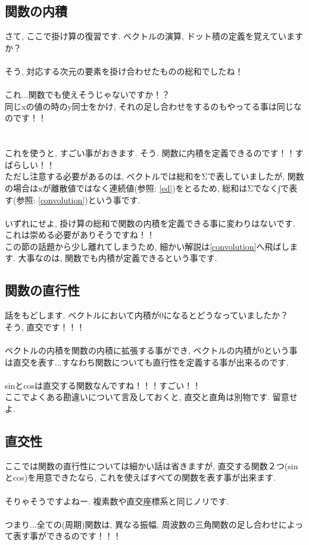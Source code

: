 \documentclass[11pt,a4paper]{jreport}
\begin{document}
\subsection{関数の内積　\label{dot}}
さて, ここで掛け算の復習です. ベクトルの演算, ドット積の定義を覚えていますか？\\
\\
そう, 対応する次元の要素を掛け合わせたものの総和でしたね！\\
\\
これ...関数でも使えそうじゃないですか！？\\
同じxの値の時のy同士をかけ, それの足し合わせをするのもやってる事は同じなのです！！\\
\\
\\
これを使うと, すごい事がおきます. そう. 関数に内積を定義できるのです！！すばらしい！！\\
ただし注意する必要があるのは, ベクトルでは総和をΣで表していましたが, 関数の場合はxが離散値ではなく連続値(参照: \ref{ed})をとるため, 総和はΣでなく∫で表す(参照: \ref{convolution})という事です.\\
\\
いずれにせよ, 掛け算の総和で関数の内積を定義できる事に変わりはないです. これは崇める必要がありそうですね！！\\
この節の話題から少し離れてしまうため, 細かい解説は\ref{convolution}へ飛ばします. 大事なのは, 関数でも内積が定義できるという事です.


\subsection{関数の直行性}
話をもどします. ベクトルにおいて内積が0になるとどうなっていましたか？\\
そう, 直交です！！！\\
\\
ベクトルの内積を関数の内積に拡張する事ができ, ベクトルの内積が0という事は直交を表す...すなわち関数についても直行性を定義する事が出来るのです.\\
\\
sinとcosは直交する関数なんですね！！！すごい！！\\
ここでよくある勘違いについて言及しておくと, 直交と直角は別物です. 留意せよ.
\subsection{直交性}
ここでは関数の直行性については細かい話は省きますが, 直交する関数２つ(sinとcos)を用意できたなら, これを使えばすべての関数を表す事が出来ます.\\
\\
そりゃそうですよねー. 複素数や直交座標系と同じノリです.\\
\\
つまり...全ての(周期)関数は, 異なる振幅, 周波数の三角関数の足し合わせによって表す事ができるのです！！！\\
\end{document}
